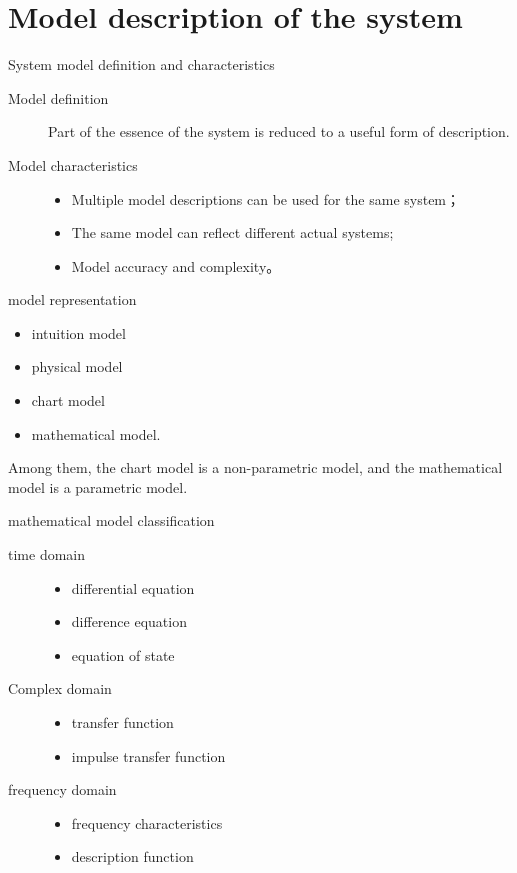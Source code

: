 \section{Model description of the system}
\begin{frame}{System model definition and characteristics}
\begin{description}
\item[Model definition]
    Part of the essence of the system is reduced to a useful form of description.
\item[Model characteristics]
\begin{itemize}
\item Multiple model descriptions can be used for the same system； 
\item The same model can reflect different actual systems;
\item Model accuracy and complexity。
\end{itemize}
\end{description}
\end{frame}

\begin{frame}{model representation}
\begin{itemize}
	\item intuition model
	\item physical model
	\item chart model
	\item mathematical model.
\end{itemize}
Among them, the chart model is a non-parametric model, and the mathematical model is a parametric model.
\end{frame}



\begin{frame}{mathematical model classification}
\begin{description}
	\item[time domain]
	\begin{itemize}
		\item differential equation
		\item difference equation
		\item equation of state
	\end{itemize}
	\item[Complex domain]
	\begin{itemize}
		\item transfer function
		\item impulse transfer function
	\end{itemize}
	\item[frequency domain]
	\begin{itemize}
		\item frequency characteristics
		\item description function
	\end{itemize}
\end{description}
\end{frame}


